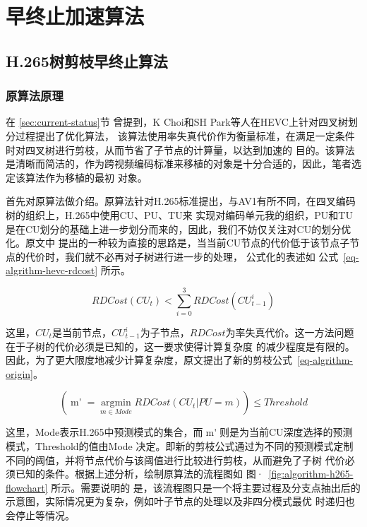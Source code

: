 \chapter{早终止加速算法}
\label{cha:algorithm}

\section{H.265树剪枝早终止算法}

\subsection{原算法原理}

在 \ref{sec:current-status}节 曾提到，K Choi和SH Park等人在HEVC上针对四叉树划分过程提出了优化算法，
该算法使用率失真代价作为衡量标准，在满足一定条件时对四叉树进行剪枝，从而节省了子节点的计算量，以达到加速的
目的。该算法是清晰而简洁的，作为跨视频编码标准来移植的对象是十分合适的，因此，笔者选定该算法作为移植的最初
对象。


首先对原算法做介绍。原算法针对H.265标准提出，与AV1有所不同，在四叉编码树的组织上，H.265中使用CU、PU、TU来
实现对编码单元我的组织，PU和TU是在CU划分的基础上进一步划分而来的，因此，我们不妨仅关注对CU的划分优化。原文中
提出的一种较为直接的思路是，当当前CU节点的代价低于该节点子节点的代价时，我们就不必再对子树进行进一步的处理，
公式化的表述如 公式~\ref{eq-algrithm-hevc-rdcost} 所示。

\begin{equation}
\label{eq-algrithm-hevc-rdcost}
RDCost(CU_t) < \sum_{i=0}^3 RDCost(CU^i_{t-1})
\end{equation}


这里，$CU_t$是当前节点，$CU^i_{t-1}$为子节点，$RDCost$为率失真代价。这一方法问题在于子树的代价必须是已知的，这一要求使得计算复杂度
的减少程度是有限的。因此，为了更大限度地减少计算复杂度，原文提出了新的剪枝公式~\ref{eq-algrithm-origin}。

\begin{equation}
\label{eq-algrithm-origin}
(\mathop{m'} =  \mathop{argmin}\limits_{m \in Mode} RDCost(CU_t | PU=m)) \le Threshold 
\end{equation}

这里，Mode表示H.265中预测模式的集合，而$\mathop{m'}$则是为当前CU深度选择的预测模式，Threshold的值由Mode
决定。即新的剪枝公式通过为不同的预测模式定制不同的阈值，并将节点代价与该阈值进行比较进行剪枝，从而避免了子树
代价必须已知的条件。根据上述分析，绘制原算法的流程图如 图·~\ref{fig:algorithm-h265-flowchart} 所示。需要说明的
是，该流程图只是一个将主要过程及分支点抽出后的示意图，实际情况更为复杂，例如叶子节点的处理以及非四分模式最优
时递归也会停止等情况。

